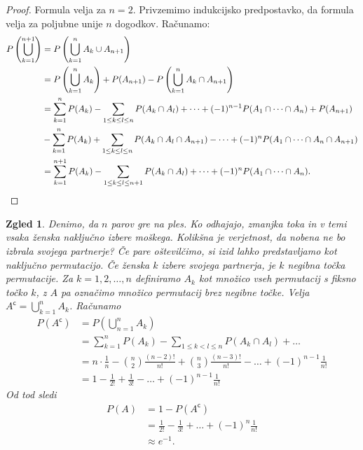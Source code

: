 \documentclass[10pt, a4paper]{article}
\newtheorem{zgled}[izr]{Zgled}
\newenvironment{noticeC}{%
  \tcolorbox[%
  notitle,
  empty,
  enhanced,  %
  breakable,
  coltext=black, 
  fontupper=\rmfamily,
  noparskip,
  sharp corners,
  boxrule=-1pt,  %
  frame hidden,
  left=7pt,  %
  right=7pt,
  top=5pt,
  bottom=5pt,
  before skip=2.5ex plus 2pt,
  after skip=2.5ex plus 2pt,
  overlay unbroken and last={%
  },
  ]}
{\endtcolorbox}
\newenvironment{dokaz}%
  {\begin{noticeC}\begin{proof}}%
  {\end{proof}\end{noticeC}}
\newcommand{\stcomp}[1]{{#1}^{\mathsf{c}}}
\begin{document}
\begin{dokaz}
    Formula velja za $n = 2$. Privzemimo indukcijsko predpostavko, da formula velja za poljubne unije $n$ dogodkov.
    Računamo:
    \begin{align*}
        P \left(\bigcup_{k = 1} ^{n + 1}\right) &= P\left(\bigcup_{k = 1} ^n A_k \cup A_{n + 1}\right)\\
        &= P \left(\bigcup_{k = 1} ^n A_k\right) + P(A_{n + 1}) - P \left(\bigcup_{k = 1} ^n A_k \cap A_{n + 1}\right)\\
        &= \sum_{k = 1} ^n P(A_k) - \sum_{1 \leq k \leq l \leq n} P(A_k \cap A_l) + \dots + (-1)^{n - 1} P(A_1 \cap \dots \cap A_n) + P(A_{n + 1})\\
        &- \sum_{k = 1} ^n P(A_k) + \sum_{1 \leq k \leq l \leq n} P(A_k \cap A_l \cap A_{n + 1}) - \dots + (-1)^n P(A_1 \cap \dots \cap A_n \cap A_{n + 1})\\
        &= \sum_{k = 1} ^{n+1} P(A_k)- \sum_{1 \leq k \leq l \leq n + 1} P(A_k \cap A_l) + \dots + (-1)^n P(A_1 \cap \dots \cap A_n). \qedhere
    \end{align*}
\end{dokaz}

\begin{zgled}
    Denimo, da $n$ parov gre na ples. Ko odhajajo, zmanjka toka in v temi vsaka 
    ženska naključno izbere moškega. Kolikšna je verjetnost, da nobena ne bo izbrala svojega partnerje?
    Če pare oštevilčimo, si izid lahko predstavljamo kot naključno permutacijo.
    Če ženska $k$ izbere svojega partnerja, je $k$ negibna točka permutacije.
    Za $k = 1, 2, \dots, n$ definiramo $A_k$ kot množico vseh permutacij s fiksno točko $k$, z $A$ pa označimo 
    množico permutacij brez negibne točke.
    Velja $\stcomp{A} = \bigcup_{k = 1} ^n A_k$. Računamo 
    \begin{align*}
        P(\stcomp{A}) &= P \left(\bigcup_{n = 1} ^n A_k\right)\\
        &= \sum_{k = 1} ^n P(A_k) - \sum_{1 \leq k < l \leq n} P(A_k \cap A_l) + \dots\\
        &= n \cdot \frac{1}{n} - \binom{n}{2} \frac{(n - 2)!}{n!} + \binom{n}{3} \frac{(n - 3)!}{n!} - \dots + (-1)^{n - 1} \frac{1}{n!}\\
        &= 1 - \frac{1}{2!} + \frac{1}{3!} - \dots + (-1)^{n - 1} \frac{1}{n!}
    \end{align*}
    Od tod sledi 
    \begin{align*}
        P(A) &= 1 - P(\stcomp{A})\\
        &= \frac{1}{2!} - \frac{1}{3!} + \dots + (-1)^n \frac{1}{n!}\\
        &\approx e^{-1}.
    \end{align*}
\end{zgled}
\end{document}
